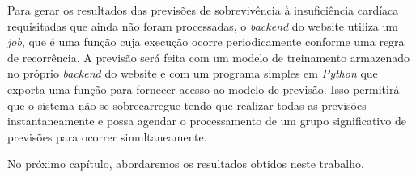 Para gerar os resultados das previsões de sobrevivência à insuficiência cardíaca requisitadas que ainda não foram processadas, o \textit{backend} do website utiliza um \textit{job}, que é uma função cuja execução ocorre periodicamente conforme uma regra de recorrência. A previsão será feita com um modelo de treinamento armazenado no próprio \textit{backend} do website e com um programa simples em \textit{Python} que exporta uma função para fornecer acesso ao modelo de previsão. Isso permitirá que o sistema não se sobrecarregue tendo que realizar todas as previsões instantaneamente e possa agendar o processamento de um grupo significativo de previsões para ocorrer simultaneamente.

No próximo capítulo, abordaremos os resultados obtidos neste trabalho.
